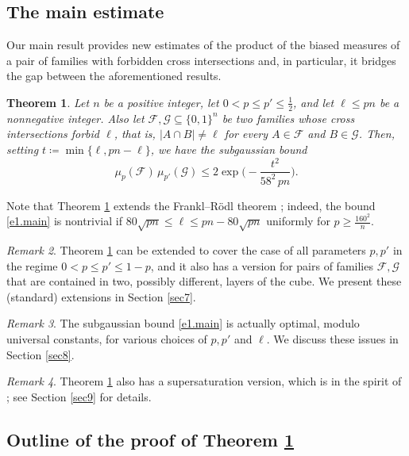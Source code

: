 \documentclass[10pt,a4paper]{amsart}
\newtheorem{thm}{Theorem}[section]
\theoremstyle{remark}
\newtheorem{rem}[thm]{Remark}
\newcommand{\meg}{\geqslant}
\newcommand{\mik}{\leqslant}
\newcommand{\Fcal}{\mathcal{F}}
\newcommand{\Gcal}{\mathcal{G}}
\begin{document}
\subsection{The main estimate} \label{subsec1.2}

Our main result provides new estimates of the product of the biased measures of a pair of families
with forbidden cross intersections and, in particular, it bridges the gap between the aforementioned results.

\begin{thm} \label{main}
Let $n$ be a positive integer, let $0<p\mik p'\mik \frac12$, and let $\ell\mik pn$ be a nonnegative integer.
Also let $\Fcal,\Gcal\subseteq \{0,1\}^n$ be two families whose cross intersections forbid $\ell$, that is,
$|A\cap B|\neq \ell$ for every $A\in\Fcal$ and $B\in\Gcal$. Then, setting $t\coloneqq \min\{\ell,pn-\ell\}$,
we have the subgaussian bound
\begin{equation} \label{e1.main}
\mu_p(\Fcal)\, \mu_{p'}(\Gcal) \mik 2\exp\Big( - \frac{t^2}{58^2\, pn}\Big).
\end{equation}
\end{thm}

Note that Theorem \ref{main} extends the Frankl--R\"{o}dl theorem \cite[Theorem 1.5]{FR87};
indeed, the bound \eqref{e1.main} is nontrivial if $80\sqrt{pn}\mik \ell \mik pn-80\sqrt{pn}$
uniformly for $p\meg \frac{160^2}{n}$.
\begin{rem} \label{r1.2}
Theorem \ref{main} can be extended to cover the case of all parameters $p,p'$ in the regime
$0<p\mik p'\mik 1-p$, and it also has a version for pairs of families $\Fcal,\Gcal$ that are contained
in two, possibly different, layers of the cube. We present these (standard) extensions in Section \ref{sec7}.
\end{rem}
\begin{rem} \label{r1.3}
The subgaussian bound \eqref{e1.main} is actually optimal, modulo universal constants,
for various choices of $p,p'$ and $\ell$. We discuss these issues in Section \ref{sec8}.
\end{rem}
\begin{rem} \label{r1.4}
Theorem \ref{main} also has a supersaturation version, which is in the spirit of
\cite[Theorem 1.14]{FR87}; see Section \ref{sec9} for details.
\end{rem}

\subsection{Outline of the proof of Theorem \ref{main}} \label{subsec1.3}
\end{document}
